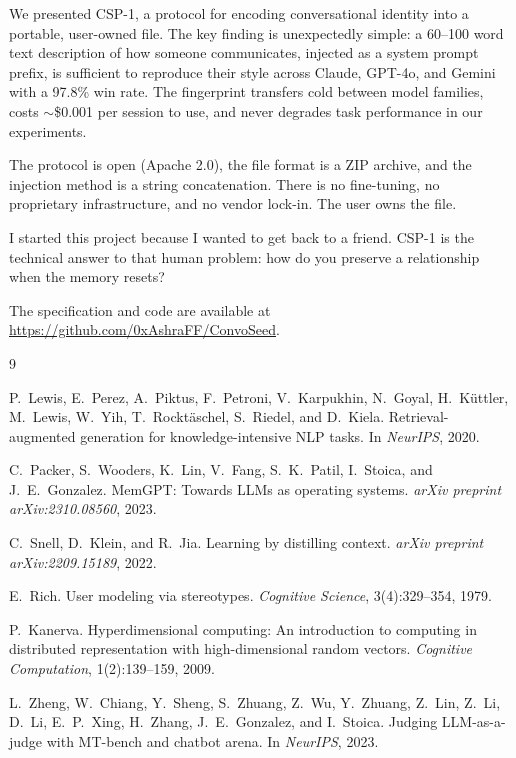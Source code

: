 \documentclass[11pt,a4paper]{article}
\begin{document}
We presented CSP-1, a protocol for encoding conversational identity into a portable, user-owned file. The key finding is unexpectedly simple: a 60--100 word text description of how someone communicates, injected as a system prompt prefix, is sufficient to reproduce their style across Claude, GPT-4o, and Gemini with a 97.8\% win rate. The fingerprint transfers cold between model families, costs $\sim$\$0.001 per session to use, and never degrades task performance in our experiments.

The protocol is open (Apache 2.0), the file format is a ZIP archive, and the injection method is a string concatenation. There is no fine-tuning, no proprietary infrastructure, and no vendor lock-in. The user owns the file.

I started this project because I wanted to get back to a friend. CSP-1 is the technical answer to that human problem: how do you preserve a relationship when the memory resets?

The specification and code are available at \url{https://github.com/0xAshraFF/ConvoSeed}.



\begin{thebibliography}{9}

P.~Lewis, E.~Perez, A.~Piktus, F.~Petroni, V.~Karpukhin, N.~Goyal, H.~K\"uttler, M.~Lewis, W.~Yih, T.~Rockt\"aschel, S.~Riedel, and D.~Kiela.
\newblock Retrieval-augmented generation for knowledge-intensive NLP tasks.
\newblock In \textit{NeurIPS}, 2020.

C.~Packer, S.~Wooders, K.~Lin, V.~Fang, S.~K.~Patil, I.~Stoica, and J.~E.~Gonzalez.
\newblock MemGPT: Towards LLMs as operating systems.
\newblock \textit{arXiv preprint arXiv:2310.08560}, 2023.

C.~Snell, D.~Klein, and R.~Jia.
\newblock Learning by distilling context.
\newblock \textit{arXiv preprint arXiv:2209.15189}, 2022.

E.~Rich.
\newblock User modeling via stereotypes.
\newblock \textit{Cognitive Science}, 3(4):329--354, 1979.

P.~Kanerva.
\newblock Hyperdimensional computing: An introduction to computing in distributed representation with high-dimensional random vectors.
\newblock \textit{Cognitive Computation}, 1(2):139--159, 2009.

L.~Zheng, W.~Chiang, Y.~Sheng, S.~Zhuang, Z.~Wu, Y.~Zhuang, Z.~Lin, Z.~Li, D.~Li, E.~P.~Xing, H.~Zhang, J.~E.~Gonzalez, and I.~Stoica.
\newblock Judging LLM-as-a-judge with MT-bench and chatbot arena.
\newblock In \textit{NeurIPS}, 2023.

\end{thebibliography}
\end{document}
